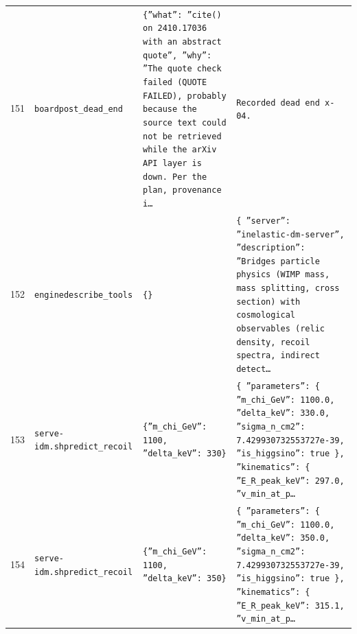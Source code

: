\documentclass[11pt,a4paper]{article}
\begin{document}
\begin{longtable}{@{}p{}p{}p{}p{}@{}}
151 & \texttt{board}\newline\texttt{post\_\allowbreak{}dead\_\allowbreak{}end} & \texttt{\{''what'':\allowbreak{} ''cite()\allowbreak{} on 2410.17036 with an abstract quote'',\allowbreak{} ''why'':\allowbreak{} ''The quote check failed (QUOTE FAILED)\allowbreak{},\allowbreak{} probably because the source text could not be retrieved while the arXiv API layer is down. Per the plan,\allowbreak{} provenance i\ldots{}\allowbreak{}} & \texttt{Recorded dead end x-04.} \\
152 & \texttt{engine}\newline\texttt{describe\_\allowbreak{}tools} & \texttt{\{\}\allowbreak{}} & \texttt{\{   ''server'':\allowbreak{} ''inelastic-dm-server'',\allowbreak{}   ''description'':\allowbreak{} ''Bridges particle physics (WIMP mass,\allowbreak{} mass splitting,\allowbreak{} cross section)\allowbreak{} with cosmological observables (relic density,\allowbreak{} recoil spectra,\allowbreak{} indirect detect\ldots{}\allowbreak{}} \\
153 & \texttt{serve-idm.sh}\newline\texttt{predict\_\allowbreak{}recoil} & \texttt{\{''m\_\allowbreak{}chi\_\allowbreak{}GeV'':\allowbreak{} 1100,\allowbreak{} ''delta\_\allowbreak{}keV'':\allowbreak{} 330\}\allowbreak{}} & \texttt{\{   ''parameters'':\allowbreak{} \{     ''m\_\allowbreak{}chi\_\allowbreak{}GeV'':\allowbreak{} 1100.0,\allowbreak{}     ''delta\_\allowbreak{}keV'':\allowbreak{} 330.0,\allowbreak{}     ''sigma\_\allowbreak{}n\_\allowbreak{}cm2'':\allowbreak{} 7.429930732553727e-39,\allowbreak{}     ''is\_\allowbreak{}higgsino'':\allowbreak{} true   \}\allowbreak{},\allowbreak{}   ''kinematics'':\allowbreak{} \{     ''E\_\allowbreak{}R\_\allowbreak{}peak\_\allowbreak{}keV'':\allowbreak{} 297.0,\allowbreak{}     ''v\_\allowbreak{}min\_\allowbreak{}at\_\allowbreak{}p\ldots{}\allowbreak{}} \\
154 & \texttt{serve-idm.sh}\newline\texttt{predict\_\allowbreak{}recoil} & \texttt{\{''m\_\allowbreak{}chi\_\allowbreak{}GeV'':\allowbreak{} 1100,\allowbreak{} ''delta\_\allowbreak{}keV'':\allowbreak{} 350\}\allowbreak{}} & \texttt{\{   ''parameters'':\allowbreak{} \{     ''m\_\allowbreak{}chi\_\allowbreak{}GeV'':\allowbreak{} 1100.0,\allowbreak{}     ''delta\_\allowbreak{}keV'':\allowbreak{} 350.0,\allowbreak{}     ''sigma\_\allowbreak{}n\_\allowbreak{}cm2'':\allowbreak{} 7.429930732553727e-39,\allowbreak{}     ''is\_\allowbreak{}higgsino'':\allowbreak{} true   \}\allowbreak{},\allowbreak{}   ''kinematics'':\allowbreak{} \{     ''E\_\allowbreak{}R\_\allowbreak{}peak\_\allowbreak{}keV'':\allowbreak{} 315.1,\allowbreak{}     ''v\_\allowbreak{}min\_\allowbreak{}at\_\allowbreak{}p\ldots{}\allowbreak{}} \\

\end{longtable}
\end{document}

